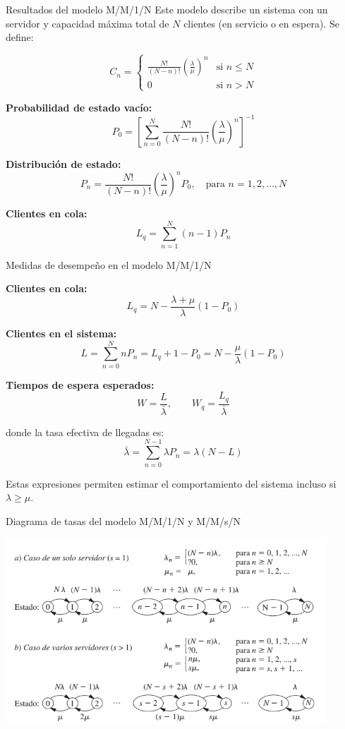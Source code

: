 \documentclass{beamer}
\begin{document}
\begin{frame}{Resultados del modelo M/M/1/N}
\justifying
Este modelo describe un sistema con un servidor y capacidad máxima total de $N$ clientes (en servicio o en espera). Se define:

\[
C_n =
\begin{cases}
\displaystyle \frac{N!}{(N - n)!} \left( \frac{\lambda}{\mu} \right)^n & \text{si } n \leq N \\
0 & \text{si } n > N
\end{cases}
\]

\medskip
\textbf{Probabilidad de estado vacío:}
\[
P_0 = \left[ \sum_{n=0}^{N} \frac{N!}{(N - n)!} \left( \frac{\lambda}{\mu} \right)^n \right]^{-1}
\]

\textbf{Distribución de estado:}
\[
P_n = \frac{N!}{(N - n)!} \left( \frac{\lambda}{\mu} \right)^n P_0, \quad \text{para } n = 1, 2, \dots, N
\]

\textbf{Clientes en cola:}
\[
L_q = \sum_{n=1}^{N} (n - 1) P_n
\]
\end{frame}


\begin{frame}{Medidas de desempeño en el modelo M/M/1/N}
\justifying

\textbf{Clientes en cola:}
\[
L_q = N - \frac{\lambda + \mu}{\lambda}(1 - P_0)
\]

\textbf{Clientes en el sistema:}
\[
L = \sum_{n=0}^{N} n P_n = L_q + 1 - P_0 = N - \frac{\mu}{\lambda}(1 - P_0)
\]

\medskip
\textbf{Tiempos de espera esperados:}
\[
W = \frac{L}{\bar{\lambda}}, \qquad
W_q = \frac{L_q}{\bar{\lambda}}
\]

donde la tasa efectiva de llegadas es:
\[
\bar{\lambda} = \sum_{n=0}^{N-1} \lambda P_n = \lambda (N - L)
\]

\medskip
Estas expresiones permiten estimar el comportamiento del sistema incluso si $\lambda \geq \mu$.
\end{frame}

\begin{frame}{Diagrama de tasas del modelo M/M/1/N y M/M/s/N}
\justifying

\begin{center}
    \includegraphics[width=0.9\textwidth]{images/Modelo_mm1n.png}
\end{center}
\end{frame}
\end{document}
